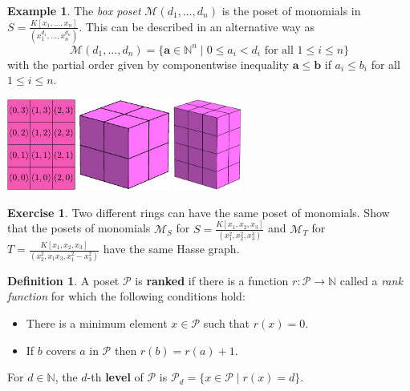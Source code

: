 \documentclass[11pt]{amsart}
\newcommand{\N}{{\mathbb N}}
\newcommand{\ba}{{\mathbf a}}
\newcommand{\bb}{{\mathbf b}}
\newcommand{\M}{{\mathcal M}}
\renewcommand{\P}{{\mathcal P}}
\theoremstyle{plain} %
\theoremstyle{definition}
\newtheorem{defn}[thm]{Definition}
\newtheorem{ex}[thm]{Example}
\newtheorem{exer}[thm]{Exercise}
\theoremstyle{remark}
\numberwithin{equation}{section}  %
\begin{document}
\begin{ex}
The {\em box poset} $\M(d_1, \ldots, d_n)$ is the poset of monomials in $S=\frac{K[x_1,\ldots, x_n]}{(x_1^{d_1}, \ldots, x_n^{d_n})}$. This can be described in an alternative way as
\[
\M(d_1, \ldots, d_n)=\{\ba \in \N^n \mid 0\leq a_i<d_i \text{ for all } 1\leq i\leq n\}
\]
with the partial order given by componentwise inequality $\ba\leq \bb $ if $a_i\leq b_i$  for all  $1\leq i\leq n$.
\smallskip
\begin{center}
	\includegraphics[height=3cm]{Pictures/2D_3_4.pdf}
	\qquad 
	\includegraphics[height=3cm]{Pictures/3D_cube.pdf}
	\qquad 
	\includegraphics[height=3cm]{Pictures/3D_2_3_4.pdf}
\end{center}
\end{ex}


\begin{tcolorbox}[reset]
\begin{exer} Two different rings can have the same poset of monomials. Show that the posets of monomials $\M_S$ for $S=\frac{K[x_1,x_2,x_3]}{(x_1^{2}, x_2^2, x_3^{3})}$ and $\M_T$ for $T=\frac{K[x_1,x_2,x_3]}{(x_2^{2}, x_1x_3, x_1^2-x_3^{2})}$ have the same Hasse graph.
\end{exer}
\end{tcolorbox}


\begin{tcolorbox}
\begin{defn}
A poset $\P$ is {\bf ranked} if there is a function $r : \P \to \N$ called a {\em rank function} for which the following conditions hold:
\begin{itemize}
\item  There is a minimum element $x \in \P$ such that $r(x) = 0$.
\item If  $b$ covers $a$ in $\P$ then $r(b)=r(a)+1$.
\end{itemize}
For $d\in \N$, the $d$-th {\bf level} of $\P$ is $\P_d =\{x\in \P \mid r(x)=d\}$.
\end{defn}
\end{tcolorbox}
\end{document}
